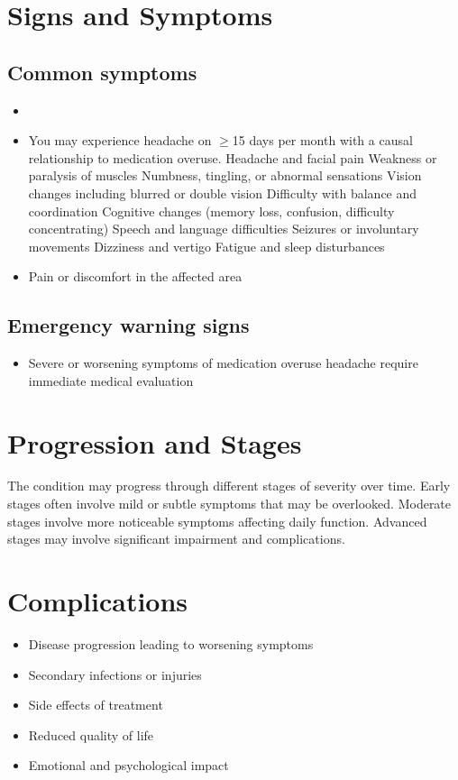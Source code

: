 \section{Signs and Symptoms}
\subsection{Common symptoms}
\begin{itemize}[noitemsep]
  \item \item You may experience headache on $\ge$15 days per month with a causal relationship to medication overuse. Headache and facial pain Weakness or paralysis of muscles Numbness, tingling, or abnormal sensations Vision changes including blurred or double vision Difficulty with balance and coordination Cognitive changes (memory loss, confusion, difficulty concentrating) Speech and language difficulties Seizures or involuntary movements Dizziness and vertigo Fatigue and sleep disturbances
  \item Pain or discomfort in the affected area
  \end{itemize}
\subsection{Emergency warning signs}
\begin{itemize}[noitemsep]
  \item Severe or worsening symptoms of medication overuse headache require immediate medical evaluation
\end{itemize}
\section{Progression and Stages}
The condition may progress through different stages of severity over time. Early stages often involve mild or subtle symptoms that may be overlooked. Moderate stages involve more noticeable symptoms affecting daily function. Advanced stages may involve significant impairment and complications.
\section{Complications}
\begin{itemize}[noitemsep]
  \item Disease progression leading to worsening symptoms
  \item Secondary infections or injuries
  \item Side effects of treatment
  \item Reduced quality of life
  \item Emotional and psychological impact
\end{itemize}

